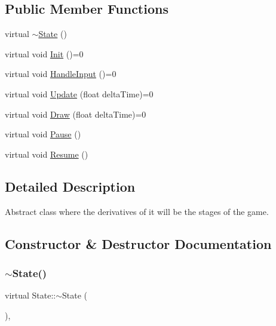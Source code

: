 \subsection*{Public Member Functions}
\begin{DoxyCompactItemize}
\item 
virtual \mbox{\hyperlink{classState_a9ddc1df6f998184d6477b48fab90281c}{$\sim$\+State}} ()
\item 
virtual void \mbox{\hyperlink{classState_a7ab4d8c6aa239a17ed579d89a209b156}{Init}} ()=0
\item 
virtual void \mbox{\hyperlink{classState_ad3de659bdeb45c97486464461d625e8f}{Handle\+Input}} ()=0
\item 
virtual void \mbox{\hyperlink{classState_a770f40188fdfc64bc95a5166fef12e02}{Update}} (float delta\+Time)=0
\item 
virtual void \mbox{\hyperlink{classState_ae3bc988c6103665bca68560742fb40e1}{Draw}} (float delta\+Time)=0
\item 
virtual void \mbox{\hyperlink{classState_aeba18061e63cd52551a045fb94836298}{Pause}} ()
\item 
virtual void \mbox{\hyperlink{classState_a8c585ea3e766c2e2404a957907310983}{Resume}} ()
\end{DoxyCompactItemize}


\subsection{Detailed Description}
Abstract class where the derivatives of it will be the stages of the game. 

\subsection{Constructor \& Destructor Documentation}
\mbox{\label{classState_a9ddc1df6f998184d6477b48fab90281c}} 
\subsubsection{\texorpdfstring{$\sim$\+State()}{~State()}}
{\footnotesize\ttfamily virtual State\+::$\sim$\+State (\begin{DoxyParamCaption}{ }\end{DoxyParamCaption})\hspace{0.3cm}{\ttfamily [inline]}, {\ttfamily [virtual]}}



